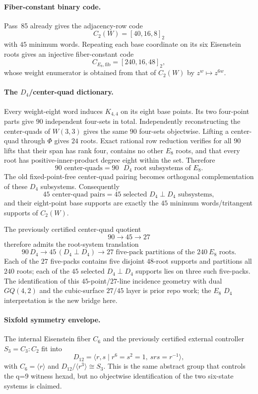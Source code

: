 \paragraph{Fiber-constant binary code.}
Pass~85 already gives the adjacency-row code
\[
 C_2(W)=[40,16,8]_2
\]
with $45$ minimum words.  Repeating each base coordinate on its six Eisenstein roots gives an injective fiber-constant code
\[
  \boxed{C_{E_8,\mathrm{fib}}=[240,16,48]_2},
\]
whose weight enumerator is obtained from that of $C_2(W)$ by $z^w\mapsto z^{6w}$.

\paragraph{The $D_4$/center-quad dictionary.}
Every weight-eight word induces $K_{4,4}$ on its eight base points.  Its two four-point parts give $90$ independent four-sets in total.  Independently reconstructing the center-quads of $W(3,3)$ gives the same $90$ four-sets objectwise.  Lifting a center-quad through $\Phi$ gives $24$ roots.  Exact rational row reduction verifies for all $90$ lifts that their span has rank four, contains no other $E_8$ roots, and that every root has positive-inner-product degree eight within the set.  Therefore
\[
  \boxed{90\text{ center-quads}=90\text{ }D_4\text{ root subsystems of }E_8}.
\]
The old fixed-point-free center-quad pairing becomes orthogonal complementation of these $D_4$ subsystems.  Consequently
\[
  \boxed{45\text{ center-quad pairs}=45\text{ selected }D_4\perp D_4\text{ subsystems}},
\]
and their eight-point base supports are exactly the $45$ minimum words/tritangent supports of $C_2(W)$.

The previously certified center-quad quotient
\[
  90\longrightarrow45\longrightarrow27
\]
therefore admits the root-system translation
\[
  \boxed{90\,D_4\longrightarrow45\,(D_4\perp D_4)\longrightarrow27\text{ five-pack partitions of the }240\ E_8\text{ roots}}.
\]
Each of the $27$ five-packs contains five disjoint $48$-root supports and partitions all $240$ roots; each of the $45$ selected $D_4\perp D_4$ supports lies on three such five-packs.  The identification of this $45$-point/$27$-line incidence geometry with dual $GQ(4,2)$ and the cubic-surface $27/45$ layer is prior repo work; the $E_8$ $D_4$ interpretation is the new bridge here.

\paragraph{Sixfold symmetry envelope.}
The internal Eisenstein fiber $C_6$ and the previously certified external controller $S_3=C_3{:}C_2$ fit into
\[
  D_{12}=\langle r,s\mid r^6=s^2=1,\ srs=r^{-1}\rangle,
\]
with $C_6=\langle r\rangle$ and $D_{12}/\langle r^3\rangle\cong S_3$.  This is the same abstract group that controls the q=9 witness hexad, but no objectwise identification of the two six-state systems is claimed.

